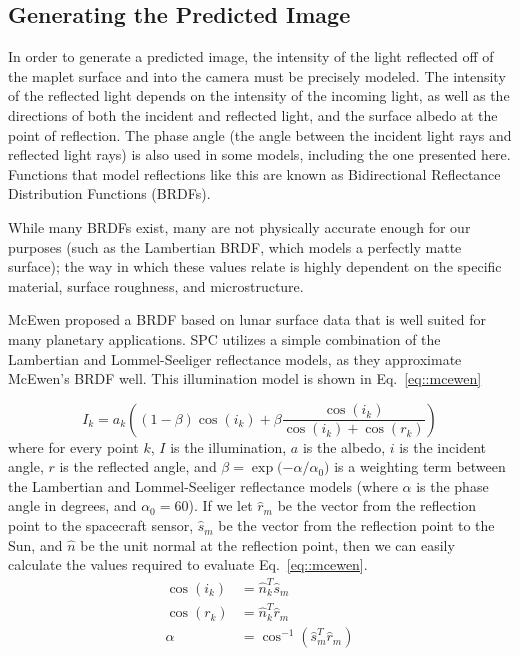 \documentclass{src/RPI-SIW}
\begin{document}
\subsection*{Generating the Predicted Image}
In order to generate a predicted image, the intensity of the light reflected off of the maplet surface and into the camera must be precisely modeled.  The intensity of the reflected light depends on the intensity of the incoming light, as well as the directions of both the incident and reflected light, and the surface albedo at the point of reflection.  The phase angle (the angle between the incident light rays and reflected light rays) is also used in some models, including the one presented here.  Functions that model reflections like this are known as Bidirectional Reflectance Distribution Functions (BRDFs).

While many BRDFs exist, many are not physically accurate enough for our purposes (such as the Lambertian BRDF, which models a perfectly matte surface); the way in which these values relate is highly dependent on the specific material, surface roughness, and microstructure.

McEwen proposed a BRDF based on lunar surface data that is well suited for many planetary applications.\cite{mcewen}  SPC utilizes a simple combination of the Lambertian and Lommel-Seeliger reflectance models, as they approximate McEwen's BRDF well.\cite{gaskell_nav_overview}  This illumination model is shown in Eq.~\eqref{eq::mcewen}

\begin{equation}
	\label{eq::mcewen}
	I_k = a_k \left((1-\beta)\cos{(i_k)} + \beta \frac{\cos{(i_k)}}{\cos{(i_k)} + \cos{(r_k)}}\right)
\end{equation}
where for every point $k$, $I$ is the illumination, $a$ is the albedo, $i$ is the incident angle, $r$ is the reflected angle, and $\beta = \exp{(-\alpha/\alpha_0})$ is a weighting term between the Lambertian and Lommel-Seeliger reflectance models (where $\alpha$ is the phase angle in degrees, and $\alpha_0 = 60$).  If we let $\hat{r}_m$ be the vector from the reflection point to the spacecraft sensor, $\hat{s}_m$ be the vector from the reflection point to the Sun, and $\hat{n}$ be the unit normal at the reflection point, then we can easily calculate the values required to evaluate Eq.~\eqref{eq::mcewen}.
\begin{align*}
	\cos{(i_k)} &= \hat{n}_k^T \hat{s}_m \\
	\cos{(r_k)} &= \hat{n}_k^T \hat{r}_m \\
	\alpha &= \cos^{-1}{\left(\hat{s}_m^T \hat{r}_m \right)}
\end{align*}
\end{document}
